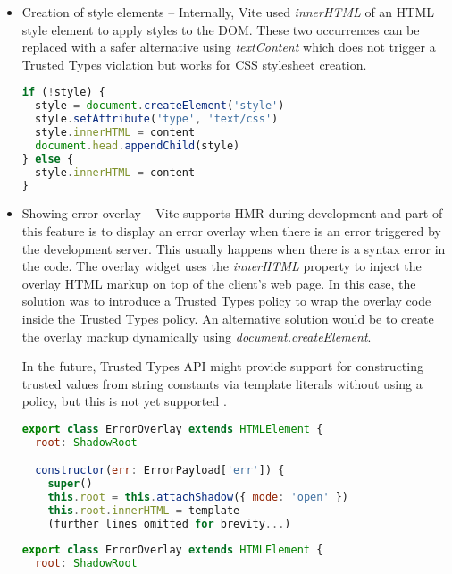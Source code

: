 \begin{itemize}
  \item Creation of style elements -- Internally, Vite used \emph{innerHTML} of an HTML style
        element to apply styles to the DOM. These two occurrences can be replaced with a
        safer alternative using \emph{textContent} which does not trigger a Trusted Types
        violation but works for CSS stylesheet creation.

        \bigskip
        \begin{lstlisting}[language=JavaScript, caption=Creation of style elements using \emph{innerHTML} in Vite \cite{commit_vite_inner_html_styles}]
if (!style) {
  style = document.createElement('style')
  style.setAttribute('type', 'text/css')
  style.innerHTML = content
  document.head.appendChild(style)
} else {
  style.innerHTML = content
}
\end{lstlisting}

  \item Showing error overlay -- Vite supports HMR during development and part of this feature is to
        display an error overlay when there is an error triggered by the development server. This
        usually happens when there is a syntax error in the code. The overlay widget uses the
        \emph{innerHTML} property to inject the overlay HTML markup on top of the client's web
        page. In this case, the solution was to introduce a Trusted Types policy to wrap the overlay
        code inside the Trusted Types policy. An alternative solution would be to create the overlay
        markup dynamically using \emph{document.createElement}.

        In the future, Trusted Types API might provide support for constructing trusted values from
        string constants via template literals without using a policy, but this is not yet supported
        \cite{tt_from_literal_method}.

        \bigskip
        \begin{lstlisting}[language=JavaScript, caption=Creation of error overlay using \emph{innerHTML} property \cite{commit_vite_inner_html_overlay}]
export class ErrorOverlay extends HTMLElement {
  root: ShadowRoot

  constructor(err: ErrorPayload['err']) {
    super()
    this.root = this.attachShadow({ mode: 'open' })
    this.root.innerHTML = template
    (further lines omitted for brevity...)
\end{lstlisting}

        \bigskip
        \begin{lstlisting}[language=JavaScript, caption=Creation of error overlay using Trusted Types policy \cite{commit_vite_policy_overlay}]
export class ErrorOverlay extends HTMLElement {
  root: ShadowRoot


\end{lstlisting}
\end{itemize}

